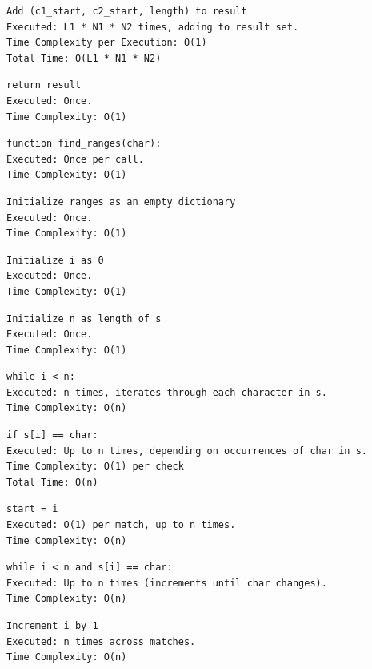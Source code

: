 \documentclass[12 pt]{article}
\begin{document}
\begin{verbatim}
Add (c1_start, c2_start, length) to result
Executed: L1 * N1 * N2 times, adding to result set.
Time Complexity per Execution: O(1)
Total Time: O(L1 * N1 * N2)
\end{verbatim}

\begin{verbatim}
return result
Executed: Once.
Time Complexity: O(1)
\end{verbatim}

\begin{verbatim}
function find_ranges(char):
Executed: Once per call.
Time Complexity: O(1)
\end{verbatim}

\begin{verbatim}
Initialize ranges as an empty dictionary
Executed: Once.
Time Complexity: O(1)
\end{verbatim}

\begin{verbatim}
Initialize i as 0
Executed: Once.
Time Complexity: O(1)
\end{verbatim}

\begin{verbatim}
Initialize n as length of s
Executed: Once.
Time Complexity: O(1)
\end{verbatim}

\begin{verbatim}
while i < n:
Executed: n times, iterates through each character in s.
Time Complexity: O(n)
\end{verbatim}

\begin{verbatim}
if s[i] == char:
Executed: Up to n times, depending on occurrences of char in s.
Time Complexity: O(1) per check
Total Time: O(n)
\end{verbatim}

\begin{verbatim}
start = i
Executed: O(1) per match, up to n times.
Time Complexity: O(n)
\end{verbatim}

\begin{verbatim}
while i < n and s[i] == char:
Executed: Up to n times (increments until char changes).
Time Complexity: O(n)
\end{verbatim}

\begin{verbatim}
Increment i by 1
Executed: n times across matches.
Time Complexity: O(n)
\end{verbatim}
\end{document}
